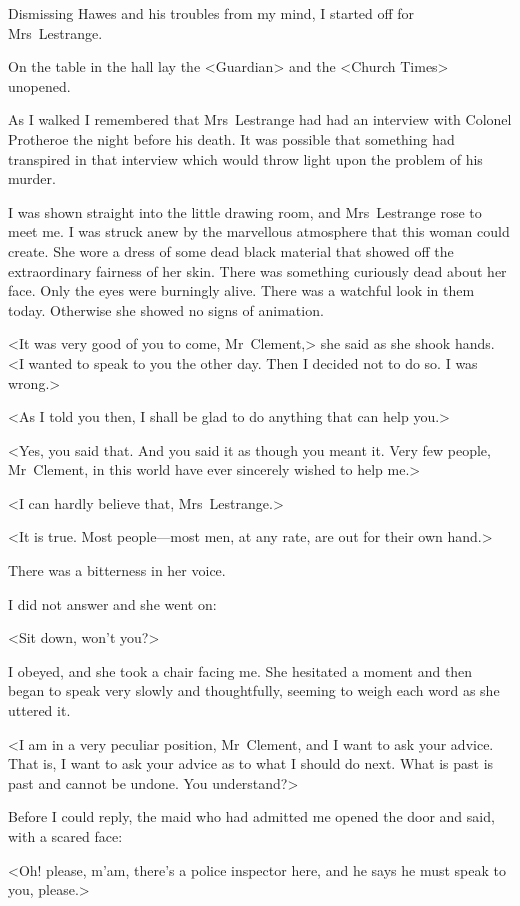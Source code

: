 Dismissing Hawes and his troubles from my mind, I started off for Mrs~Lestrange.

On the table in the hall lay the <Guardian> and the <Church Times> unopened.

As I walked I remembered that Mrs~Lestrange had had an interview with Colonel Protheroe the night before his death. It was possible that something had transpired in that interview which would throw light upon the problem of his murder.

I was shown straight into the little drawing room, and Mrs~Lestrange rose to meet me. I was struck anew by the marvellous atmosphere that this woman could create. She wore a dress of some dead black material that showed off the extraordinary fairness of her skin. There was something curiously dead about her face. Only the eyes were burningly alive. There was a watchful look in them today. Otherwise she showed no signs of animation.

<It was very good of you to come, Mr~Clement,> she said as she shook hands. <I wanted to speak to you the other day. Then I decided not to do so. I was wrong.>

<As I told you then, I shall be glad to do anything that can help you.>

<Yes, you said that. And you said it as though you meant it. Very few people, Mr~Clement, in this world have ever sincerely wished to help me.>

<I can hardly believe that, Mrs~Lestrange.>

<It is true. Most people—most men, at any rate, are out for their own hand.>

There was a bitterness in her voice.

I did not answer and she went on:

<Sit down, won't you?>

I obeyed, and she took a chair facing me. She hesitated a moment and then began to speak very slowly and thoughtfully, seeming to weigh each word as she uttered it.

<I am in a very peculiar position, Mr~Clement, and I want to ask your advice. That is, I want to ask your advice as to what I should do next. What is past is past and cannot be undone. You understand?>

Before I could reply, the maid who had admitted me opened the door and said, with a scared face:

<Oh! please, m'am, there's a police inspector here, and he says he must speak to you, please.>

